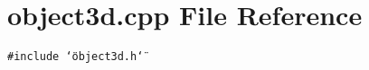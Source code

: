\section{object3d.cpp File Reference}
\label{object3d_8cpp}
{\tt \#include \char`\"{}object3d.h\char`\"{}}\par
